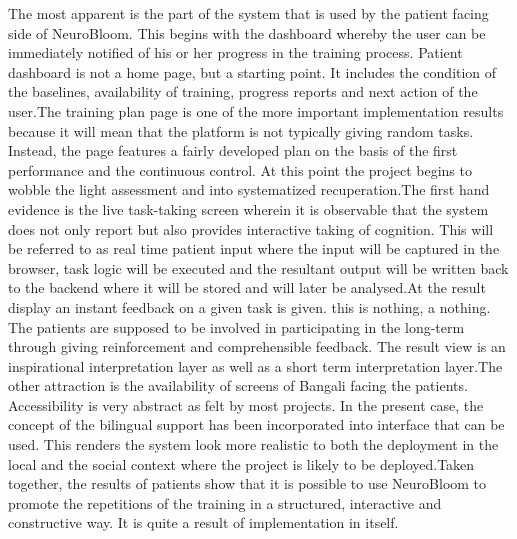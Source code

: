 \documentclass[12pt,a4paper]{report}
\begin{document}
The most apparent is the part of the system that is used by the patient facing side of NeuroBloom. This begins with the dashboard whereby the user can be immediately notified of his or her progress in the training process. Patient dashboard is not a home page, but a starting point. It includes the condition of the baselines, availability of training, progress reports and next action of the user.The training plan page is one of the more important implementation results because it will mean that the platform is not typically giving random tasks. Instead, the page features a fairly developed plan on the basis of the first performance and the continuous control. At this point the project begins to wobble the light assessment and into systematized recuperation.The first hand evidence is the live task-taking screen wherein it is observable that the system does not only report but also provides interactive taking of cognition. This will be referred to as real time patient input where the input will be captured in the browser, task logic will be executed and the resultant output will be written back to the backend where it will be stored and will later be analysed.At the result display an instant feedback on a given task is given. this is nothing, a nothing. The patients are supposed to be involved in participating in the long-term through giving reinforcement and comprehensible feedback. The result view is an inspirational interpretation layer as well as a short term interpretation layer.The other attraction is the availability of screens of Bangali facing the patients. Accessibility is very abstract as felt by most projects. In the present case, the concept of the bilingual support has been incorporated into interface that can be used. This renders the system look more realistic to both the deployment in the local and the social context where the project is likely to be deployed.Taken together, the results of patients show that it is possible to use NeuroBloom to promote the repetitions of the training in a structured, interactive and constructive way. It is quite a result of implementation in itself.

\FloatBarrier
\end{document}
